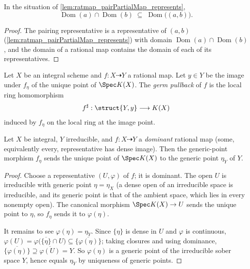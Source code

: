 \begin{lemma}
  \label{lem:ratmap_le_domain_prod}
  \leanok
  In the situation of \ref{lem:ratmap_pairPartialMap_represents},
  \[
    \operatorname{Dom}(a) \cap \operatorname{Dom}(b)
    \;\subseteq\; \operatorname{Dom}\bigl((a,b)\bigr).
  \]
\end{lemma}
\begin{proof}
  \leanok
  The pairing representative is a representative of \((a, b)\)
  (\ref{lem:ratmap_pairPartialMap_represents}) with domain
  \(\operatorname{Dom}(a) \cap \operatorname{Dom}(b)\), and the domain of a
  rational map contains the domain of each of its representatives.
\end{proof}

\begin{definition}
  \label{def:ratmap_stalkPullback}
  \leanok
  Let \(X\) be an integral scheme and \(f : X \dashrightarrow Y\) a rational
  map. Let \(y \in Y\) be the image under \(f_\eta\) of the unique point of
  \(\Spec K(X)\). The \emph{germ pullback} of \(f\) is the local ring
  homomorphism
  \[
    f^\sharp : \struct{Y, y} \longrightarrow K(X)
  \]
  induced by \(f_\eta\) on the local ring at the image point.
\end{definition}

\begin{theorem}
  \label{thm:ratmap_dominant_generic}
  \leanok
  Let \(X\) be integral, \(Y\) irreducible, and \(f : X \dashrightarrow Y\) a
  \emph{dominant} rational map (some, equivalently every, representative has
  dense image). Then the generic-point morphism \(f_\eta\) sends the unique
  point of \(\Spec K(X)\) to the generic point \(\eta_Y\) of \(Y\).
\end{theorem}
\begin{proof}
  \leanok
  Choose a representative \((U, \varphi)\) of \(f\); it is dominant. The open
  \(U\) is irreducible with generic point \(\eta = \eta_X\) (a dense open of an
  irreducible space is irreducible, and its generic point is that of the ambient
  space, which lies in every nonempty open). The canonical morphism
  \(\Spec K(X) \to U\) sends the unique point to \(\eta\), so
  \(f_\eta\) sends it to \(\varphi(\eta)\).

  It remains to see \(\varphi(\eta) = \eta_Y\). Since \(\{\eta\}\) is dense in
  \(U\) and \(\varphi\) is continuous,
  \(\varphi(U) = \varphi\bigl(\overline{\{\eta\}} \cap U\bigr) \subseteq
  \overline{\{\varphi(\eta)\}}\); taking closures and using dominance,
  \(\overline{\{\varphi(\eta)\}} \supseteq \overline{\varphi(U)} = Y\). So
  \(\varphi(\eta)\) is a generic point of the irreducible sober space \(Y\),
  hence equals \(\eta_Y\) by uniqueness of generic points.
\end{proof}

